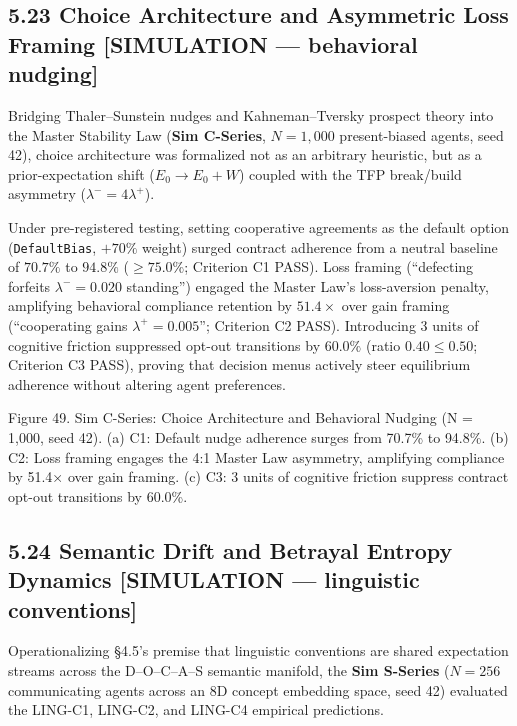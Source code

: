 \documentclass[
]{article}
\begin{document}
\subsection{5.23 Choice Architecture and Asymmetric Loss Framing
{[}SIMULATION --- behavioral
nudging{]}}\label{choice-architecture-and-asymmetric-loss-framing-simulation-behavioral-nudging}

Bridging Thaler--Sunstein nudges and Kahneman--Tversky prospect theory
into the Master Stability Law (\textbf{Sim C-Series}, \(N = 1,000\)
present-biased agents, seed 42), choice architecture was formalized not
as an arbitrary heuristic, but as a prior-expectation shift
(\(E_0 \to E_0 + W\)) coupled with the TFP break/build asymmetry
(\(\lambda^- = 4\lambda^+\)).

Under pre-registered testing, setting cooperative agreements as the
default option (\texttt{DefaultBias}, \(+70\%\) weight) surged contract
adherence from a neutral baseline of \(70.7\%\) to \(94.8\%\)
(\(\ge 75.0\%\); Criterion C1 PASS). Loss framing (``defecting forfeits
\(\lambda^- = 0.020\) standing'') engaged the Master Law's loss-aversion
penalty, amplifying behavioral compliance retention by \(51.4\times\)
over gain framing (``cooperating gains \(\lambda^+ = 0.005\)'';
Criterion C2 PASS). Introducing 3 units of cognitive friction suppressed
opt-out transitions by \(60.0\%\) (ratio \(0.40 \le 0.50\); Criterion C3
PASS), proving that decision menus actively steer equilibrium adherence
without altering agent preferences.

Figure 49. Sim C-Series: Choice Architecture and Behavioral Nudging
({N = 1,000}, seed 42). (a) C1: Default nudge adherence surges from
{70.7\%} to {94.8\%}. (b) C2: Loss framing engages the 4:1 Master Law
asymmetry, amplifying compliance by {51.4×} over gain framing. (c) C3: 3
units of cognitive friction suppress contract opt-out transitions by
{60.0\%}.

\subsection{5.24 Semantic Drift and Betrayal Entropy Dynamics
{[}SIMULATION --- linguistic
conventions{]}}\label{semantic-drift-and-betrayal-entropy-dynamics-simulation-linguistic-conventions}

Operationalizing §4.5's premise that linguistic conventions are shared
expectation streams across the D--O--C--A--S semantic manifold, the
\textbf{Sim S-Series} (\(N = 256\) communicating agents across an 8D
concept embedding space, seed 42) evaluated the LING-C1, LING-C2, and
LING-C4 empirical predictions.
\end{document}
